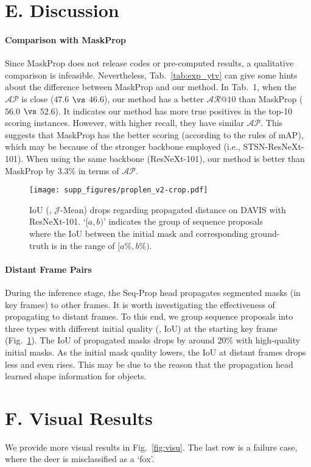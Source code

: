 \documentclass[10pt,twocolumn,letterpaper]{article}
\begin{document}
	\section*{E. Discussion} \label{sec:discuss}
	\paragraph{Comparison with MaskProp} 
	Since MaskProp \cite{bertasius2020maskprop} does not release codes or pre-computed results, a qualitative comparison is infeasible.
	Nevertheless, Tab.~\ref{tab:exp_ytv} can give some hints about the difference between MaskProp and our method. In Tab.~1, when the $\mathcal{AP}$ is close ($47.6$ $\vs$ $46.6$), our method has a better $\mathcal{AR}@10$ than MaskProp ($56.0$ $\vs$ $52.6$). It indicates our method has more true positives in the top-10 scoring instances. However, with higher recall, they have similar $\mathcal{AP}$. This suggests that MaskProp has the better scoring (according to the rules of mAP), which may be because of the stronger backbone employed (i.e., STSN-ResNeXt-101). When using the same backbone (ResNeXt-101), our method is better than MaskProp by $3.3\%$ in terms of $\mathcal{AP}$.

	\begin{figure}[h]
		\begin{center}
\texttt{[image: supp\_figures/proplen\_v2-crop.pdf]}
		\end{center}
		\vspace{-0.15in}
		\caption{IoU (\ie, $\mathcal{J}$-Mean) drops regarding propagated distance on DAVIS with ResNeXt-101. 
			`$[a,b)$' indicates the group of sequence proposals where the IoU between the initial mask and corresponding ground-truth is in the range of $[a\%, b\%)$.
		}
		\label{fig:abl_proplen}
		\vspace{-0.2in}
	\end{figure}
	
	\paragraph{Distant Frame Pairs}
	During the inference stage, the Seq-Prop head propagates segmented masks (in key frames) to other frames. It is worth investigating the effectiveness of propagating to distant frames.
	To this end, we group sequence proposals into three types with different initial quality (\ie, IoU) at the starting key frame (Fig.~\ref{fig:abl_proplen}).
	The IoU of propagated masks drops by around $20\%$ with high-quality initial masks. 
	As the initial mask quality lowers, the IoU at distant frames drops less and even rises. This may be due to the reason that the propagation head learned shape information for objects.

	
	\vspace{-0.07in}
	\section*{F. Visual Results} \label{sec:visu}
	\vspace{-0.05in}
	We provide more visual results in Fig.~\ref{fig:visu}. The last row is a failure case, where the deer is misclassified as a `fox'.
	
\end{document}
